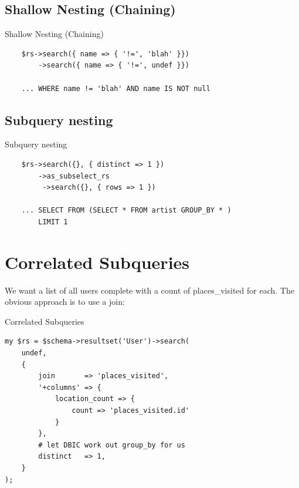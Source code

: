 
\subsection{Shallow Nesting (Chaining)}

\begin{frame}[fragile]{Shallow Nesting (Chaining)}
\begin{lstlisting}
    $rs->search({ name => { '!=', 'blah' }})
        ->search({ name => { '!=', undef }})

    ... WHERE name != 'blah' AND name IS NOT null
\end{lstlisting}
\end{frame}

\subsection{Subquery nesting}

\begin{frame}[fragile]{Subquery nesting}
\begin{lstlisting}
    $rs->search({}, { distinct => 1 })
        ->as_subselect_rs
         ->search({}, { rows => 1 })

    ... SELECT FROM (SELECT * FROM artist GROUP_BY * )
        LIMIT 1
\end{lstlisting}
\end{frame}

\section{Correlated Subqueries}

We want a list of all users complete with a count of places\_visited for each. The
obvious approach is to use a join:

\begin{frame}[fragile]{Correlated Subqueries}
\begin{lstlisting}
my $rs = $schema->resultset('User')->search(
    undef,
    {
        join       => 'places_visited',
        '+columns' => {
            location_count => {
                count => 'places_visited.id'
            }
        },
        # let DBIC work out group_by for us
        distinct   => 1,    
    }
);
\end{lstlisting}
\end{frame}

